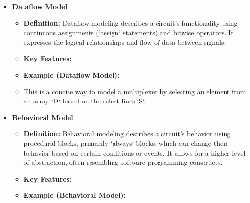 \documentclass{article}
\begin{document}
\begin{itemize}
\begin{itemize}
    \item \textbf{Dataflow Model}
    
    \begin{itemize}
        \item \textbf{Definition:} Dataflow modeling describes a circuit's functionality using continuous assignments (`assign` statements) and bitwise operators. It expresses the logical relationships and flow of data between signals.
        \item \textbf{Key Features:}
        
        \item \textbf{Example (Dataflow Model):}
        
        \item This is a concise way to model a multiplexer by selecting an element from an array `D` based on the select lines `S`.
    \end{itemize}
    
    \item \textbf{Behavioral Model}
    
    \begin{itemize}
        \item \textbf{Definition:} Behavioral modeling describes a circuit's behavior using procedural blocks, primarily `always` blocks, which can change their behavior based on certain conditions or events. It allows for a higher level of abstraction, often resembling software programming constructs.
        \item \textbf{Key Features:}
        
        \item \textbf{Example (Behavioral Model):}
        

\end{itemize}
\end{itemize}
\end{itemize}
\end{document}
